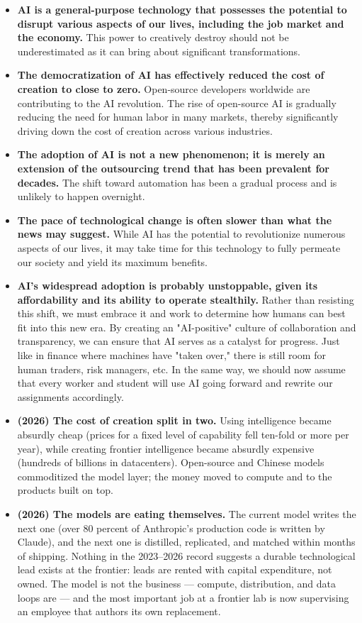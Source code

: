 \begin{itemize}
\item \textbf{AI is a general-purpose technology that possesses the potential to disrupt various aspects of our lives, including the job market and the economy.} This power to creatively destroy should not be underestimated as it can bring about significant transformations.
\item \textbf{The democratization of AI has effectively reduced the cost of creation to close to zero.} Open-source developers worldwide are contributing to the AI revolution. The rise of open-source AI is gradually reducing the need for human labor in many markets, thereby significantly driving down the cost of creation across various industries.
\item \textbf{The adoption of AI is not a new phenomenon; it is merely an extension of the outsourcing trend that has been prevalent for decades.} The shift toward automation has been a gradual process and is unlikely to happen overnight.
\item \textbf{The pace of technological change is often slower than what the news may suggest.} While AI has the potential to revolutionize numerous aspects of our lives, it may take time for this technology to fully permeate our society and yield its maximum benefits.
\item \textbf{AI's widespread adoption is probably unstoppable, given its affordability and its ability to operate stealthily.} Rather than resisting this shift, we must embrace it and work to determine how humans can best fit into this new era. By creating an "AI-positive" culture of collaboration and transparency, we can ensure that AI serves as a catalyst for progress. Just like in finance where machines have "taken over," there is still room for human traders, risk managers, etc. In the same way, we should now assume that every worker and student will use AI going forward and rewrite our assignments accordingly.
\item \textbf{(2026) The cost of creation split in two.} Using intelligence became absurdly cheap (prices for a fixed level of capability fell ten-fold or more per year), while creating frontier intelligence became absurdly expensive (hundreds of billions in datacenters). Open-source and Chinese models commoditized the model layer; the money moved to compute and to the products built on top.
\item \textbf{(2026) The models are eating themselves.} The current model writes the next one (over 80 percent of Anthropic's production code is written by Claude), and the next one is distilled, replicated, and matched within months of shipping. Nothing in the 2023--2026 record suggests a durable technological lead exists at the frontier: leads are rented with capital expenditure, not owned. The model is not the business --- compute, distribution, and data loops are --- and the most important job at a frontier lab is now supervising an employee that authors its own replacement.
\end{itemize}
